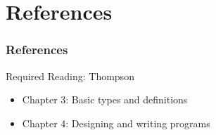\documentclass[dvipsnames]{beamer}
\theoremstyle{plain}
\begin{document}
\section*{References}

\begin{frame}
  \frametitle{References}

  \begin{block}{Required Reading: Thompson}
    \begin{itemize}
      \item Chapter 3: \alert{Basic types and definitions}
      \item Chapter 4: \alert{Designing and writing programs}
    \end{itemize}
  \end{block}
\end{frame}
\end{document}
